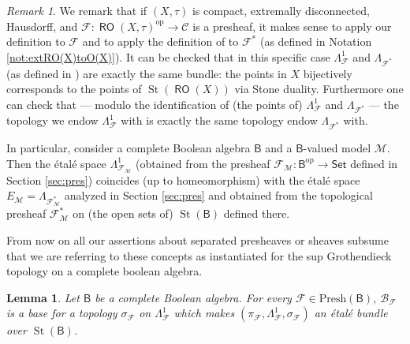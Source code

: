 \documentclass[11pt]{amsart}
\newcommand{\F}{\mathcal{F}}
\newcommand{\Presh}{\textrm{Presh}}
\theoremstyle{plain}
\newtheorem{lemma}[theorem]{Lemma}
\theoremstyle{definition}
\theoremstyle{plain}
\theoremstyle{remark}
\newtheorem{remark}[theorem]{Remark}
\newcommand{\M}{\mathcal{M}}
\newcommand{\dSet}{\mathsf{Set}}
\DeclareMathOperator{\St}{St}
\DeclareMathOperator{\RO}{\mathsf{RO}}
\newcommand{\bool}[1]{\mathsf{#1}}
\newcommand{\0}{\mathsf{0}}
\renewcommand{\1}{\mathsf{1}}
\renewcommand{\2}{\mathsf{2}}
\theoremstyle{definition}
\begin{document}
\begin{remark}
We remark that if $(X,\tau)$ is compact, extremally disconnected, Hausdorff, 
and $\F:\RO(X,\tau)^{\mathrm{op}}\to\mathcal{C}$ is a presheaf, it makes sense to apply our definition to $\F$ and to apply the definition of \cite[Section II.5]{MacLMoer} to $\F^*$ (as defined in Notation \ref{not:extRO(X)toO(X)}). It can be checked that in this specific case $\Lambda^1_\F$ and $\Lambda_{\F^*}$ (as defined in \cite[Section II.5]{MacLMoer}) are exactly the same bundle: the points in $X$ bijectively corresponds to the points of $\St(\RO(X))$ via Stone duality. Furthermore one can check that --- modulo the identification of (the points of) $\Lambda^1_\F$ and $\Lambda_{\F^*}$ ---  the topology we endow $\Lambda^1_\F$ with is exactly the same topology \cite[Section II.5]{MacLMoer} endow $\Lambda_{\F^*}$ with.

In particular, consider a complete Boolean algebra $\bool{B}$ and a $\bool{B}$-valued model $\M$. Then the \'etal\'e space $\Lambda^1_{\F_\M}$ (obtained from the presheaf $\F_\M:\bool{B}^{\textrm{op}}\to\dSet$ defined in Section \ref{sec:pres}) coincides (up to homeomorphism) with the \'etal\'e space $E_\M=\Lambda_{\F^*_\M}$ analyzed in Section \ref{sec:pres} and obtained from the topological presheaf $\F^*_\M$ on (the open sets of) $\St(\bool{B})$ defined there.

\end{remark}



From now on 
all our assertions about separated presheaves or sheaves subsume that we are referring to these concepts as instantiated for the sup Grothendieck topology on a complete boolean algebra.



\begin{lemma}
Let $\bool{B}$ be a complete Boolean algebra.
For every $\F\in\Presh(\bool{B})$, $\mathcal{B}_\F$ is a base for a  topology $\sigma_\F$ on $\Lambda^1_\F$ which makes $(\pi_\F,\Lambda^1_\F,\sigma_\F)$ an \'etal\'e bundle over $\St(\bool{B})$.
\end{lemma}
\end{document}
